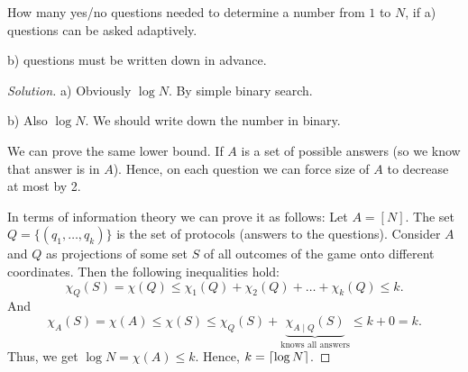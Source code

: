 \begin{example}
    How many yes/no questions needed to determine a number from $1$ to $N$, if
    a) questions can be asked adaptively.

    b) questions must be written down in advance.
\end{example}
\begin{proof}[Solution]
    a) Obviously $\log N$.
    By simple binary search.

    b) Also $\log N$.
    We should write down the number in binary.

    We can prove the same lower bound.
    If $A$ is a set of possible answers (so we know that answer is in $A$).
    Hence, on each question we can force size of $A$ to decrease at most by 2.

    In terms of information theory we can prove it as follows:
    Let $A = [N]$.
    The set $Q = \{(q_1, \ldots, q_k)\}$ is the set of protocols (answers to the questions).
    Consider $A$ and $Q$ as projections of some set $S$ of all outcomes of the game onto different coordinates.
    Then the following inequalities hold:
    \[
        \chi_Q(S) = \chi(Q) \leq \chi_1(Q) + \chi_2(Q) + \dots + \chi_k(Q) \leq k.
    \]
    And
    \[
        \chi_A(S) = \chi(A) \leq \chi(S) \leq \chi_Q(S) + \underbrace{\chi_{A \mid Q}(S)}_{\text{knows all answers}} \leq k + 0 = k.
    \]
    Thus, we get $\log N = \chi(A) \leq k$.
    Hence, $k = \left\lceil \log N \right\rceil$.
\end{proof}

